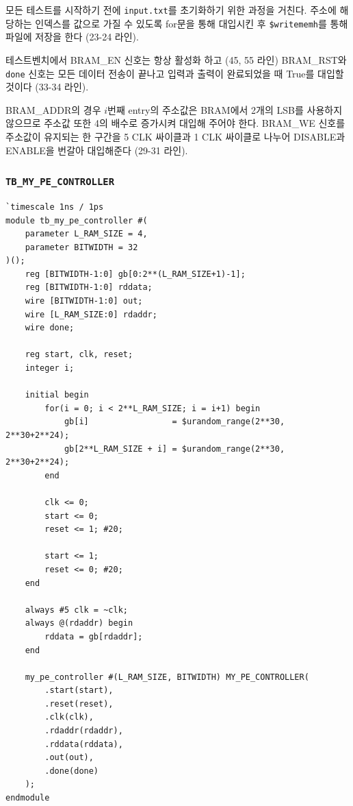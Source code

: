 \documentclass{article}
\newcommand{\orange}[1]{{\color{orange} #1}}
\begin{document}
\orange{
\begin{itemize*}
\item 모든 테스트를 시작하기 전에 \texttt{input.txt}를 초기화하기 위한 과정을 거친다. 주소에 해당하는 인덱스를 값으로 가질 수 있도록 for문을 통해 대입시킨 후 \texttt{\$writememh}를 통해 파일에 저장을 한다 (23-24 라인).\\
\item 테스트벤치에서 BRAM\_EN 신호는 항상 활성화 하고 (45, 55 라인) BRAM\_RST와 \texttt{done} 신호는 모든 데이터 전송이 끝나고 입력과 출력이 완료되었을 때 True를 대입할 것이다 (33-34 라인).\\
\item BRAM\_ADDR의 경우 $i$번째 entry의 주소값은 BRAM에서 2개의 LSB를 사용하지 않으므로 주소값 또한 4의 배수로 증가시켜 대입해 주어야 한다. BRAM\_WE 신호를 주소값이 유지되는 한 구간을 5 CLK 싸이클과 1 CLK 싸이클로 나누어 DISABLE과 ENABLE을 번갈아 대입해준다 (29-31 라인).
\end{itemize*}
}

\subsubsection*{\texttt{TB\_MY\_PE\_CONTROLLER}}
\begin{lstlisting}[style={verilog-style}]
`timescale 1ns / 1ps
module tb_my_pe_controller #(
    parameter L_RAM_SIZE = 4,
    parameter BITWIDTH = 32
)();
    reg [BITWIDTH-1:0] gb[0:2**(L_RAM_SIZE+1)-1];
    reg [BITWIDTH-1:0] rddata;
    wire [BITWIDTH-1:0] out;
    wire [L_RAM_SIZE:0] rdaddr;
    wire done;
    
    reg start, clk, reset;
    integer i;
    
    initial begin
        for(i = 0; i < 2**L_RAM_SIZE; i = i+1) begin
            gb[i]                 = $urandom_range(2**30, 2**30+2**24);
            gb[2**L_RAM_SIZE + i] = $urandom_range(2**30, 2**30+2**24);
        end
    
        clk <= 0;
        start <= 0;
        reset <= 1; #20;
        
        start <= 1;
        reset <= 0; #20;
    end
    
    always #5 clk = ~clk;
    always @(rdaddr) begin
        rddata = gb[rdaddr];
    end
    
    my_pe_controller #(L_RAM_SIZE, BITWIDTH) MY_PE_CONTROLLER(
        .start(start),
        .reset(reset),
        .clk(clk),
        .rdaddr(rdaddr),
        .rddata(rddata),
        .out(out),
        .done(done)
    );
endmodule
\end{lstlisting}
\end{document}
